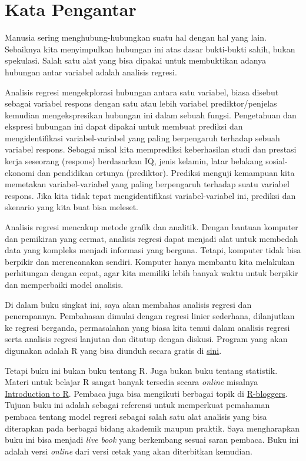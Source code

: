 \documentclass[
]{book}
\begin{document}
\hypertarget{kata-pengantar}{%
\chapter*{Kata Pengantar}\label{kata-pengantar}}

Manusia sering menghubung-hubungkan suatu hal dengan hal yang lain. Sebaiknya kita menyimpulkan hubungan ini atas dasar bukti-bukti sahih, bukan spekulasi. Salah satu alat yang bisa dipakai untuk membuktikan adanya hubungan antar variabel adalah analisis regresi.

Analisis regresi mengekplorasi hubungan antara satu variabel, biasa disebut sebagai variabel respons dengan satu atau lebih variabel prediktor/penjelas kemudian mengekspresikan hubungan ini dalam sebuah fungsi. Pengetahuan dan ekspresi hubungan ini dapat dipakai untuk membuat prediksi dan mengidentifikasi variabel-variabel yang paling berpengaruh terhadap sebuah variabel respons. Sebagai misal kita memprediksi keberhasilan studi dan prestasi kerja seseorang (respons) berdasarkan IQ, jenis kelamin, latar belakang sosial-ekonomi dan pendidikan ortunya (prediktor). Prediksi menguji kemampuan kita memetakan variabel-variabel yang paling berpengaruh terhadap suatu variabel respons. Jika kita tidak tepat mengidentifikasi variabel-variabel ini, prediksi dan skenario yang kita buat bisa meleset.

Analisis regresi mencakup metode grafik dan analitik. Dengan bantuan komputer dan pemikiran yang cermat, analisis regresi dapat menjadi alat untuk membedah data yang kompleks menjadi informasi yang berguna. Tetapi, komputer tidak bisa berpikir dan merencanakan sendiri. Komputer hanya membantu kita melakukan perhitungan dengan cepat, agar kita memiliki lebih banyak waktu untuk berpikir dan memperbaiki model analisis.

Di dalam buku singkat ini, saya akan membahas analisis regresi dan penerapannya. Pembahasan dimulai dengan regresi linier sederhana, dilanjutkan ke regresi berganda, permasalahan yang biasa kita temui dalam analisis regresi serta analisis regresi lanjutan dan ditutup dengan diskusi. Program yang akan digunakan adalah R \citep{rcoreteam2021} yang bisa diunduh secara gratis di \href{https://www.r-project.org/}{sini}.

Tetapi buku ini bukan buku tentang R. Juga bukan buku tentang statistik. Materi untuk belajar R sangat banyak tersedia secara \emph{online} misalnya \href{https://cran.r-project.org/doc/manuals/r-devel/R-intro.html}{Introduction to R}. Pembaca juga bisa mengikuti berbagai topik di \href{https://www.r-bloggers.com/}{R-bloggers}. Tujuan buku ini adalah sebagai referensi untuk memperkuat pemahaman pembaca tentang model regresi sebagai salah satu alat analisis yang bisa diterapkan pada berbagai bidang akademik maupun praktik. Saya mengharapkan buku ini bisa menjadi \emph{live book} yang berkembang sesuai saran pembaca. Buku ini adalah versi \emph{online} dari versi cetak yang akan diterbitkan kemudian.
\end{document}
